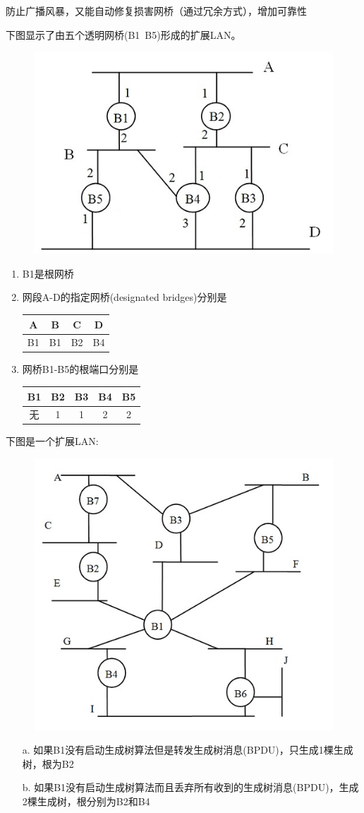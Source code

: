 防止广播风暴，又能自动修复损害网桥（通过冗余方式），增加可靠性
\begin{example}
	下图显示了由五个透明网桥(B1~B5)形成的扩展LAN。
	\begin{figure}[H]
		\centering
		\includegraphics[width=0.4\linewidth]{fig/bridge.jpg}
	\end{figure}
\end{example}
\begin{analysis}
\begin{enumerate}
	\item B1是根网桥
	\item 网段A-D的指定网桥(designated bridges)分别是
\begin{center}
	\begin{tabular}{|c|c|c|c|}\hline
		A & B & C & D\\\hline
		B1 & B1 & B2 & B4\\\hline
	\end{tabular}
\end{center}
\item 网桥B1-B5的根端口分别是
\begin{center}
	\begin{tabular}{|c|c|c|c|c|}\hline
		B1 & B2 & B3 & B4 & B5\\\hline
		无 & 1 & 1 & 2 & 2\\\hline
	\end{tabular}
\end{center}
\end{enumerate}
\end{analysis}

\begin{example}
	下图是一个扩展LAN:
	\begin{figure}[H]
		\centering
		\includegraphics[width=0.4\linewidth]{fig/spanning_tree.jpg}
	\end{figure}
\end{example}
\begin{analysis}
	\begin{itemize}
		\item[a.] 如果B1没有启动生成树算法但是转发生成树消息(BPDU)，只生成1棵生成树，根为B2
		\item[b.] 如果B1没有启动生成树算法而且丢弃所有收到的生成树消息(BPDU)，生成2棵生成树，根分别为B2和B4
	\end{itemize}
\end{analysis}


